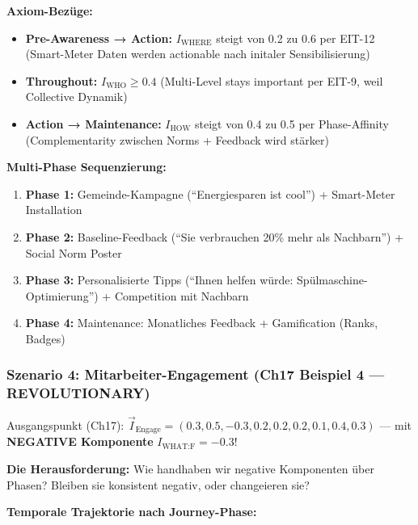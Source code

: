 \textbf{Axiom-Bezüge:}
\begin{itemize}[nosep]
\item \textbf{Pre-Awareness → Action:} $I_{\text{WHERE}}$ steigt von 0.2 zu 0.6 per EIT-12 (Smart-Meter Daten werden actionable nach initaler Sensibilisierung)
\item \textbf{Throughout:} $I_{\text{WHO}} \geq 0.4$ (Multi-Level stays important per EIT-9, weil Collective Dynamik)
\item \textbf{Action → Maintenance:} $I_{\text{HOW}}$ steigt von 0.4 zu 0.5 per Phase-Affinity (Complementarity zwischen Norms + Feedback wird stärker)
\end{itemize}

\textbf{Multi-Phase Sequenzierung:}
\begin{enumerate}[nosep]
\item \textbf{Phase 1:} Gemeinde-Kampagne (``Energiesparen ist cool'') + Smart-Meter Installation
\item \textbf{Phase 2:} Baseline-Feedback (``Sie verbrauchen 20\% mehr als Nachbarn'') + Social Norm Poster
\item \textbf{Phase 3:} Personalisierte Tipps (``Ihnen helfen würde: Spülmaschine-Optimierung'') + Competition mit Nachbarn
\item \textbf{Phase 4:} Maintenance: Monatliches Feedback + Gamification (Ranks, Badges)
\end{enumerate}

\subsubsection{Szenario 4: Mitarbeiter-Engagement (Ch17 Beispiel 4 — REVOLUTIONARY)}

Ausgangspunkt (Ch17): $\vec{I}_{\text{Engage}} = (0.3, 0.5, -0.3, 0.2, 0.2, 0.2, 0.1, 0.4, 0.3)$ — mit \textbf{NEGATIVE Komponente} $I_{\text{WHAT:F}} = -0.3$!

\textbf{Die Herausforderung:} Wie handhaben wir negative Komponenten über Phasen? Bleiben sie konsistent negativ, oder changeieren sie?

\textbf{Temporale Trajektorie nach Journey-Phase:}


